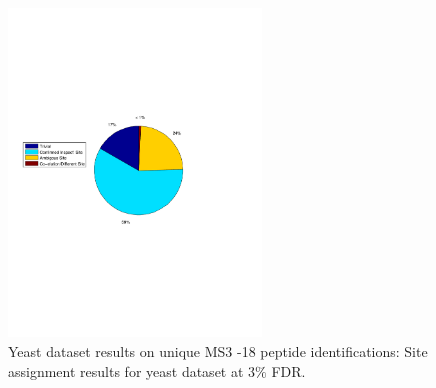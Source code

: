 \begin{figure}[htbp]
\centering %
\includegraphics[trim = 0mm 90mm 20mm 90mm,clip,width=0.6\textwidth]{fig/phospho/allIds/piechart_all_by_STY.pdf}
\caption{Yeast dataset results on unique MS3 -18 peptide identifications: Site assignment results for yeast dataset at $3\%$ FDR.}
\label{fig:yeast_piechart_uniqIds_STY}
\end{figure}

\clearpage
